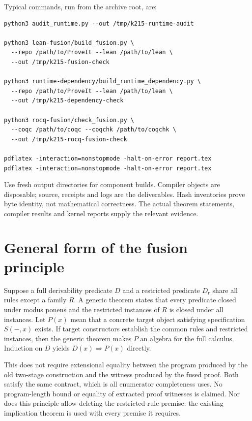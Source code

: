\documentclass[11pt]{article}
\theoremstyle{definition}\newtheorem{definition}[theorem]{Definition}
\begin{document}
Typical commands, run from the archive root, are:
\begin{lstlisting}
python3 audit_runtime.py --out /tmp/k215-runtime-audit

python3 lean-fusion/build_fusion.py \
  --repo /path/to/ProveIt --lean /path/to/lean \
  --out /tmp/k215-fusion-check

python3 runtime-dependency/build_runtime_dependency.py \
  --repo /path/to/ProveIt --lean /path/to/lean \
  --out /tmp/k215-dependency-check

python3 rocq-fusion/check_fusion.py \
  --coqc /path/to/coqc --coqchk /path/to/coqchk \
  --out /tmp/k215-rocq-fusion-check

pdflatex -interaction=nonstopmode -halt-on-error report.tex
pdflatex -interaction=nonstopmode -halt-on-error report.tex
\end{lstlisting}

Use fresh output directories for component builds. Compiler objects are
disposable; source, receipts and logs are the deliverables. Hash inventories
prove byte identity, not mathematical correctness. The actual theorem
statements, compiler results and kernel reports supply the relevant evidence.

\appendix
\section{General form of the fusion principle}

Suppose a full derivability predicate \(D\) and a restricted predicate
\(D_{\mathrm{r}}\) share all rules except a family \(R\). A generic theorem
states that every predicate closed under modus ponens and the restricted
instances of \(R\) is closed under all instances. Let \(P(x)\) mean that a
concrete target object satisfying specification \(S(-,x)\) exists. If target
constructors establish the common rules and restricted instances, then the
generic theorem makes \(P\) an algebra for the full calculus. Induction on
\(D\) yields \(D(x)\Rightarrow P(x)\) directly.

This does not require extensional equality between the program produced by
the old two-stage construction and the witness produced by the fused proof.
Both satisfy the same contract, which is all enumerator completeness uses.
No program-length bound or equality of extracted proof witnesses is claimed.
Nor does this principle allow deleting the restricted-rule premise: the
existing implication theorem is used with every premise it requires.
\end{document}

